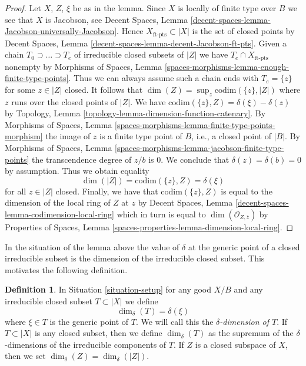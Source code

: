 \documentclass{stacks-project}
\theoremstyle{plain}
\theoremstyle{definition}
\newtheorem{definition}[subsection]{Definition}
\theoremstyle{remark}
\numberwithin{equation}{subsection}
\begin{document}
\begin{proof}
Let $X$, $Z$, $\xi$ be as in the lemma.
Since $X$ is locally of finite type over $B$ we see that $X$ is Jacobson, see
Decent Spaces, Lemma
\ref{decent-spaces-lemma-Jacobson-universally-Jacobson}.
Hence $X_{\text{ft-pts}} \subset |X|$ is the set of closed points
by Decent Spaces, Lemma \ref{decent-spaces-lemma-decent-Jacobson-ft-pts}.
Given a chain $T_0 \supset \ldots \supset T_e$
of irreducible closed subsets of $|Z|$ we have
$T_e \cap X_{\text{ft-pts}}$ nonempty by
Morphisms of Spaces, Lemma
\ref{spaces-morphisms-lemma-enough-finite-type-points}.
Thus we can always assume such a chain ends
with $T_e = \{z\}$ for some $z \in |Z|$ closed.
It follows that $\dim(Z) = \sup_z \text{codim}(\{z\}, |Z|)$
where $z$ runs over the closed points of $|Z|$.
We have $\text{codim}(\{z\}, Z) = \delta(\xi) - \delta(z)$
by Topology, Lemma \ref{topology-lemma-dimension-function-catenary}.
By Morphisms of Spaces, Lemma
\ref{spaces-morphisms-lemma-finite-type-points-morphism}
the image of $z$ is a finite type point of $B$, i.e.,
a closed point of $|B|$. By
Morphisms of Spaces, Lemma
\ref{spaces-morphisms-lemma-jacobson-finite-type-points}
the transcendence degree of $z/b$ is $0$.
We conclude that $\delta(z) = \delta(b) = 0$ by assumption.
Thus we obtain equality
$$
\dim(|Z|) = \text{codim}(\{z\}, Z) = \delta(\xi)
$$
for all $z \in |Z|$ closed. Finally, we have that
$\text{codim}(\{z\}, Z)$ is equal to the dimension of the
local ring of $Z$ at $z$ by
Decent Spaces, Lemma \ref{decent-spaces-lemma-codimension-local-ring}
which in turn is equal to
$\dim(\mathcal{O}_{Z, \overline{z}})$ by
Properties of Spaces, Lemma \ref{spaces-properties-lemma-dimension-local-ring}.
\end{proof}

\noindent
In the situation of the lemma above the value of $\delta$
at the generic point of a closed irreducible subset
is the dimension of the irreducible closed subset.
This motivates the following definition.

\begin{definition}
\label{definition-delta-dimension}
In Situation \ref{situation-setup} for any good $X/B$
and any irreducible closed subset $T \subset |X|$ we define
$$
\dim_\delta(T) = \delta(\xi)
$$
where $\xi \in T$ is the generic point of $T$.
We will call this the {\it $\delta$-dimension of $T$}.
If $T \subset |X|$ is any closed subset, then we define
$\dim_\delta(T)$ as the supremum of the $\delta$-dimensions
of the irreducible components of $T$.
If $Z$ is a closed subspace of $X$, then we set
$\dim_\delta(Z) = \dim_\delta(|Z|)$.
\end{definition}
\end{document}
